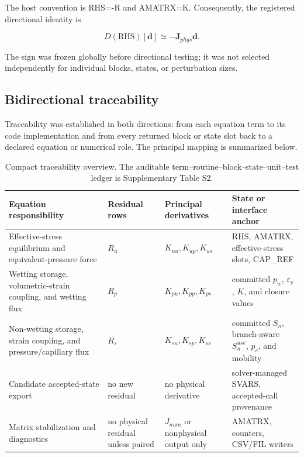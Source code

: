 \documentclass[preprint,12pt,authoryear]{elsarticle}
\begin{document}
The host convention is RHS=-R and AMATRX=K. Consequently, the registered directional identity is

\begin{equation}
D(\mathrm{RHS})[\mathbf{d}]\simeq-\mathbf{J}_{phys}\mathbf{d}.
\end{equation}

The sign was frozen globally before directional testing; it was not selected independently for individual blocks, states, or perturbation sizes.

\subsection{Bidirectional traceability}

Traceability was established in both directions: from each equation term to its code implementation and from every returned block or state slot back to a declared equation or numerical role. The principal mapping is summarized below.


\begin{table}[!htbp]
\centering
\caption{Compact traceability overview. The auditable term--routine--block--state--unit--test ledger is Supplementary Table S2.}
\label{tab:2}
\small
\begin{tabularx}{\textwidth}{@{}*{4}{>{\raggedright\arraybackslash}X}@{}}
\toprule
Equation responsibility & Residual rows & Principal derivatives & State or interface anchor \\
\midrule
Effective-stress equilibrium and equivalent-pressure force & $R_u$ & $K_{uu},K_{up},K_{us}$ & RHS, AMATRX, effective-stress slots, CAP\_\allowbreak{}REF \\
Wetting storage, volumetric-strain coupling, and wetting flux & $R_p$ & $K_{pu},K_{pp},K_{ps}$ & committed $p_w$, $\varepsilon_v$, $K$, and closure values \\
Non-wetting storage, strain coupling, and pressure/capillary flux & $R_s$ & $K_{su},K_{sp},K_{ss}$ & committed $S_n$, branch-aware $S_n^{use}$, $p_c$, and mobility \\
Candidate accepted-state export & no new residual & no physical derivative & solver-managed SVARS, accepted-call provenance \\
Matrix stabilization and diagnostics & no physical residual unless paired & $J_{num}$ or nonphysical output only & AMATRX, counters, CSV/FIL writers \\
\bottomrule
\end{tabularx}
\end{table}
\end{document}
